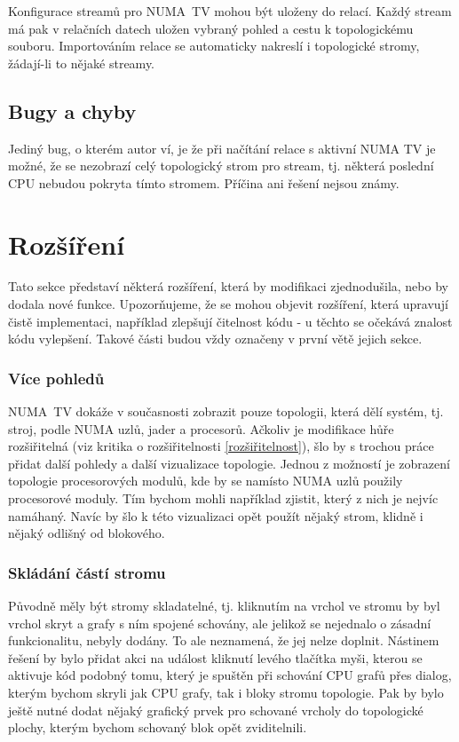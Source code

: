 Konfigurace streamů pro NUMA~TV mohou být uloženy do relací. Každý stream má pak v relačních datech uložen vybraný pohled a cestu k topologickému souboru. Importováním relace se automaticky nakreslí i topologické stromy, žádají-li to nějaké streamy.

\subsection{Bugy a chyby}

Jediný bug, o kterém autor ví, je že při načítání relace s aktivní NUMA TV je možné, že se nezobrazí celý topologický strom pro stream, tj. některá poslední CPU nebudou pokryta tímto stromem. Příčina ani řešení nejsou známy.

\section{Rozšíření}
Tato sekce představí některá rozšíření, která by modifikaci zjednodušila, nebo by dodala nové funkce. Upozorňujeme, že se mohou objevit rozšíření, která upravují čistě implementaci, například zlepšují čitelnost kódu - u těchto se očekává znalost kódu vylepšení. Takové části budou vždy označeny v první větě jejich sekce.

\subsubsection*{Více pohledů}
NUMA~TV dokáže v současnosti zobrazit pouze topologii, která dělí systém, tj. stroj, podle NUMA uzlů, jader a procesorů. Ačkoliv je modifikace hůře rozšiřitelná (viz kritika o rozšiřitelnosti \ref{rozšiřitelnost}), šlo by s trochou práce přidat další pohledy a další vizualizace topologie. Jednou z možností je zobrazení topologie procesorových modulů, kde by se namísto NUMA uzlů použily procesorové moduly. Tím bychom mohli například zjistit, který z nich je nejvíc namáhaný. Navíc by šlo k této vizualizaci opět použít nějaký strom, klidně i nějaký odlišný od blokového.

\subsubsection*{Skládání částí stromu}
Původně měly být stromy skladatelné, tj. kliknutím na vrchol ve stromu by byl vrchol skryt a grafy s ním spojené schovány, ale jelikož se nejednalo o zásadní funkcionalitu, nebyly dodány. To ale neznamená, že jej nelze doplnit. Nástinem řešení by bylo přidat akci na událost kliknutí levého tlačítka myši, kterou se aktivuje kód podobný tomu, který je spuštěn při schování CPU grafů přes dialog, kterým bychom skryli jak CPU grafy, tak i bloky stromu topologie. Pak by bylo ještě nutné dodat nějaký grafický prvek pro schované vrcholy do topologické plochy, kterým bychom schovaný blok opět zviditelnili.

